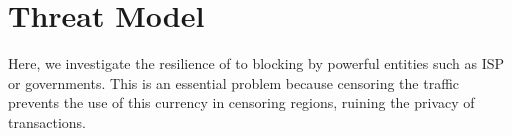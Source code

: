 \begin{comment}
\section{Distribution of Packet Sizes over Tor}\label{sec:bcshape}

Figure~\ref{fig:tor_reg_traffic_pkt_size_upstream}-\ref{fig:tor_fullblock_pkt_size_downstream} shows the upstream and downstream packet distribution of HTTP and \bc traffic behind Tor.
\begin{figure}[t]
\begin{subfigure}{0.48\linewidth}
\centering
\texttt{[image: image/tor\_reg\_traffic\_pkt\_size\_upstream.eps]}
\caption{HTTP, upstream}
\label{fig:tor_reg_traffic_pkt_size_upstream}
\end{subfigure}
\begin{subfigure}{0.48\linewidth}
\centering
\texttt{[image: image/tor\_reg\_traffic\_pkt\_size\_downstream.eps]}
\caption{HTTP, downstream}
\label{fig:tor_reg_traffic_pkt_size_downstream}
\end{subfigure} 
\begin{subfigure}{0.48\linewidth}
\centering
\texttt{[image: image/tor\_compact\_block\_pkt\_size\_upstream.eps]}
\caption{Bitcoin, Compact block, upstream}
\label{fig:tor_compact_block_pkt_size_upstream}
\end{subfigure}
\begin{subfigure}{0.48\linewidth}
\centering
\texttt{[image: image/tor\_compact\_block\_pkt\_size\_downstream.eps]}
\caption{Bitcoin, Compact block, downstream}
\label{fig:tor_compact_block_pkt_size_downstream}
\end{subfigure} 
\begin{subfigure}{0.48\linewidth}
\centering
\texttt{[image: image/tor\_fullblock\_pkt\_size\_upstream.eps]}
\caption{Bitcoin, Full block, upstream}
\label{fig:tor_fullblock_pkt_size_upstream}
\end{subfigure}
\begin{subfigure}{0.48\linewidth}
\centering
\texttt{[image: image/tor\_fullblock\_pkt\_size\_downstream.eps]}
\caption{Bitcoin, Full block, downstream}
\label{fig:tor_fullblock_pkt_size_downstream}
\end{subfigure}
\caption{Distribution of packet sizes of HTTP and Bitcoin traffic behind Tor}
\end{figure}
\end{comment}

\section{Threat Model}
Here, we investigate the resilience of \bc to blocking by powerful entities such as ISP or governments. This is an essential problem because censoring the \bc traffic prevents the use of this currency in censoring regions, ruining the privacy of transactions. 



 




